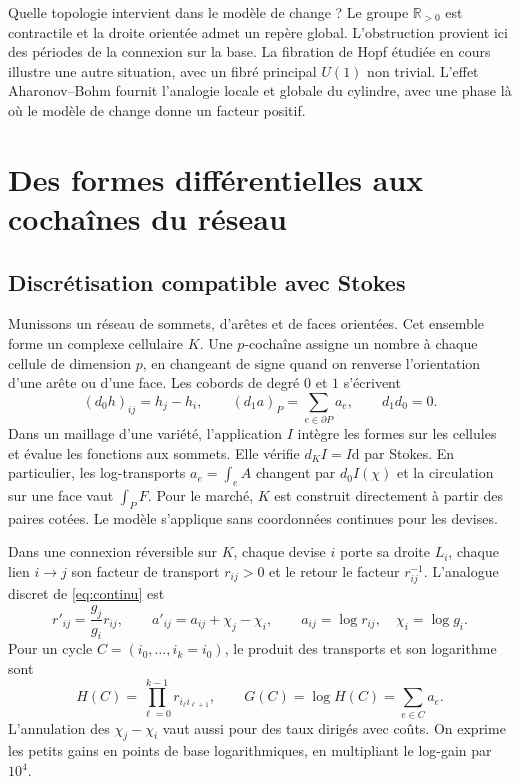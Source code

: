 \documentclass[11pt,a4paper]{article}
\theoremstyle{clair}
\newcommand{\R}{\mathbb{R}}
\newcommand{\dd}{\mathrm{d}}
\newcommand{\arrowfx}{\mathbin{\to}}
\begin{document}
\begin{callout}{Quelle topologie intervient dans le modèle de change ?}
Le groupe \(\R_{>0}\) est contractile et la droite orientée admet un repère global. L'obstruction provient ici des périodes de la connexion sur la base. La fibration de Hopf étudiée en cours illustre une autre situation, avec un fibré principal \(U(1)\) non trivial. L'effet Aharonov--Bohm fournit l'analogie locale et globale du cylindre, avec une phase là où le modèle de change donne un facteur positif.
\end{callout}

\clearpage
\section{Des formes différentielles aux cochaînes du réseau}
\label{sec:discret}
\subsection{Discrétisation compatible avec Stokes}

Munissons un réseau de sommets, d'arêtes et de faces orientées. Cet ensemble forme un complexe cellulaire \(K\). Une \(p\)-cochaîne assigne un nombre à chaque cellule de dimension \(p\), en changeant de signe quand on renverse l'orientation d'une arête ou d'une face. Les cobords de degré \(0\) et \(1\) s'écrivent
\[
 (d_0h)_{ij}=h_j-h_i,\qquad
 (d_1a)_P=\sum_{e\in\partial P}a_e,\qquad d_1d_0=0.
\]
Dans un maillage d'une variété, l'application \(I\) intègre les formes sur les cellules et évalue les fonctions aux sommets. Elle vérifie \(d_K I=I\dd\) par Stokes. En particulier, les log-transports \(a_e=\int_e A\) changent par \(d_0I(\chi)\) et la circulation sur une face vaut \(\int_P F\). Pour le marché, \(K\) est construit directement à partir des paires cotées. Le modèle s'applique sans coordonnées continues pour les devises.

Dans une connexion réversible sur \(K\), chaque devise \(i\) porte sa droite \(L_i\), chaque lien \(i\arrowfx j\) son facteur de transport \(r_{ij}>0\) et le retour le facteur \(r_{ij}^{-1}\). L'analogue discret de \eqref{eq:continu} est
\begin{equation}
 r'_{ij}=\frac{g_j}{g_i}r_{ij},\qquad a'_{ij}=a_{ij}+\chi_j-\chi_i,\qquad
 a_{ij}=\log r_{ij},\quad \chi_i=\log g_i .
 \label{eq:gauge}
\end{equation}
Pour un cycle \(C=(i_0,\ldots,i_k=i_0)\), le produit des transports et son logarithme sont
\begin{equation}
 H(C)=\prod_{\ell=0}^{k-1}r_{i_\ell i_{\ell+1}},
 \qquad G(C)=\log H(C)=\sum_{e\in C}a_e .
 \label{eq:holonomy}
\end{equation}
L'annulation des \(\chi_j-\chi_i\) vaut aussi pour des taux dirigés avec coûts. On exprime les petits gains en points de base logarithmiques, en multipliant le log-gain par \(10^4\).
\end{document}
